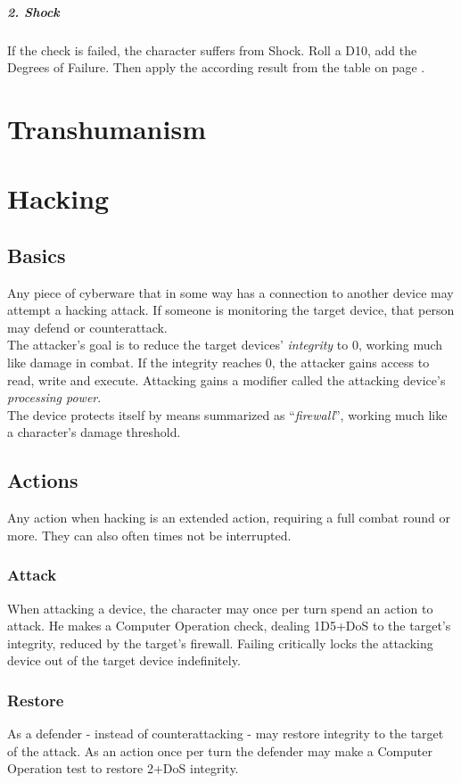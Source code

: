 \documentclass[12pt,a4paper,openany,usenames,dvipsnames]{book}
\begin{document}
	\paragraph{2. Shock}
	If the check is failed, the character suffers from Shock.
	Roll a D10, add the Degrees of Failure.
	Then apply the according result from the table on page \pageref{feartable}.

	\chapter{Transhumanism}
	

	\chapter{Hacking}
	\section{Basics}
	Any piece of cyberware that in some way has a connection to another device may attempt a hacking attack. If someone is monitoring the target device, that person may defend or counterattack.\\
	The attacker’s goal is to reduce the target devices’ \emph{integrity} to 0, working much like damage in combat. If the integrity reaches 0, the attacker gains access to read, write and execute. Attacking gains a modifier called the attacking device’s \emph{processing power}.\\
	The device protects itself by means summarized as “\emph{firewall}”, working much like a character’s damage threshold.
	\section{Actions}
	Any action when hacking is an extended action, requiring a full combat round or more. They can also often times not be interrupted.
	\subsection*{Attack}
	When attacking a device, the character may once per turn spend an action to attack.
	He makes a Computer Operation check,
		dealing 1D5+DoS to the target’s integrity,
		reduced by the target’s firewall.
	Failing critically locks the attacking device out of the target device indefinitely.
	\subsection*{Restore}
	As a defender - instead of counterattacking - may restore integrity to the target of the attack. As an action once per turn the defender may make a Computer Operation test to restore 2+DoS integrity.
\end{document}

